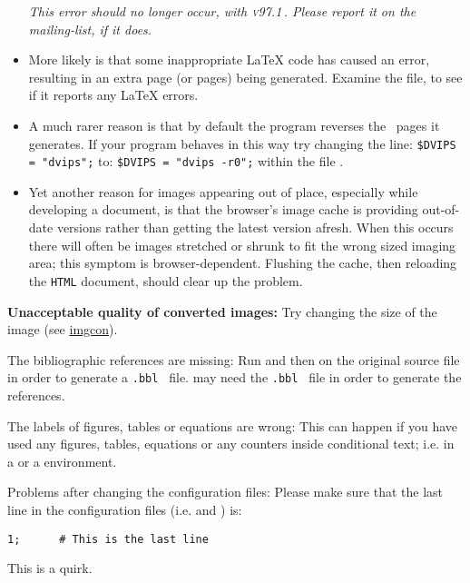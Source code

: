 \begin{htmllist}
\begin{itemize}
\smallskip\noindent
\textit{This error should no longer occur, with \textsc{v97.1}\,.
Please report it on the mailing-list, if it does.}

\item
More likely is that some inappropriate \LaTeX{} code 
has caused an error, resulting in an extra page (or pages) being generated.
Examine the  file, to see if it reports any \LaTeX{} errors.

\item
A much rarer reason is that by default the  program
reverses the \PS\ pages it generates. If your  program
behaves in this way try changing the line: \html{\\}
\verb|$DVIPS = "dvips";| \html{\\}
to: \html{\\}
\verb|$DVIPS = "dvips -r0";| \html{\\}
within the file .

\item
Yet another reason for images appearing out of place, especially while
developing a document, is that the browser's image cache is providing
out-of-date versions rather than getting the latest version afresh.
When this occurs there will often be images stretched or shrunk
to fit the wrong sized imaging area; this symptom is browser-dependent.
Flushing the cache, then reloading the \texttt{HTML} document, should
clear up the problem. 
\end{itemize}


\item [\textbf{Unacceptable quality of converted images: }]
Try changing the size of the image 
(see \hyperref{image conversion}{Section~}{}{imgcon}).

\item [The bibliographic references are missing: ]
Run  and then  on the original source file in
order to generate a \texttt{.bbl } file. 
\latextohtml{} may need the \texttt{.bbl } file in order to generate 
the references.


\item [The labels of figures, tables or equations are wrong: ]
This can happen if you have used any figures, tables, equations or
any counters inside conditional text; i.e. in a  
or a  environment. 


\item [Problems after changing the configuration files: ]
Please make sure that the last line in the configuration files 
(i.e.  and ) is:
\begin{small}
\begin{verbatim}
1;      # This is the last line
\end{verbatim}
\end{small}
This is a \Perl{} quirk.


\end{htmllist}
